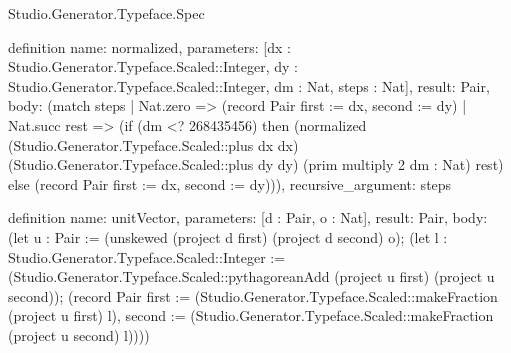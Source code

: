 \begin{lexlean}{Studio.Generator.Typeface.Spec}
\begin{semanticmodule}
definition{
  name: normalized,
  parameters: [dx : Studio.Generator.Typeface.Scaled::Integer, dy : Studio.Generator.Typeface.Scaled::Integer, dm : Nat, steps : Nat],
  result: Pair,
  body: (match steps
    | Nat.zero => (record Pair {first := dx, second := dy})
    | Nat.succ rest => (if (dm <? 268435456) then (normalized (Studio.Generator.Typeface.Scaled::plus dx dx) (Studio.Generator.Typeface.Scaled::plus dy dy) (prim multiply 2 dm : Nat) rest) else (record Pair {first := dx, second := dy}))),
  recursive_argument: steps
}

definition{
  name: unitVector,
  parameters: [d : Pair, o : Nat],
  result: Pair,
  body: (let u : Pair := (unskewed (project d first) (project d second) o); (let l : Studio.Generator.Typeface.Scaled::Integer := (Studio.Generator.Typeface.Scaled::pythagoreanAdd (project u first) (project u second)); (record Pair {first := (Studio.Generator.Typeface.Scaled::makeFraction (project u first) l), second := (Studio.Generator.Typeface.Scaled::makeFraction (project u second) l)})))
}


\end{semanticmodule}
\end{lexlean}
